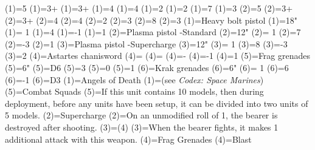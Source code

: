 \renewcommand{\UnitName}{Assault Intercessors }%
\renewcommand{\UnitPower}{10}%
\renewcommand{\UnitIcon}{Troops.svg}%
%
\renewcommand{\StatBlocks}{2}%
\Movement(1)={5}%
\WeaponSkill(1)={3+}%
\BalisticSkill(1)={3+}%
\Strength(1)={4}%
\Toughness(1)={4}%
\Wounds(1)={2}%
\Attacks(1)={2}%
\Leadership(1)={7}%
\Save(1)={3}%
%
\Movement(2)={5}%
\WeaponSkill(2)={3+}%
\BalisticSkill(2)={3+}%
\Strength(2)={4}%
\Toughness(2)={4}%
\Wounds(2)={2}%
\Attacks(2)={3}%
\Leadership(2)={8}%
\Save(2)={3}%
\renewcommand{\UnitText}{9 \UnitName and 1 Sergeant.  Each model is equiped with: \WeaponName(1); \WeaponName(4); \WeaponName(5); \WeaponName(6).}%
%
\renewcommand{\NumWeapon}{6}%
\WeaponName(1)={Heavy bolt pistol}%
\WeaponRange(1)={18"}%
\WeaponType(1)={ 1}%
\WeaponStrength(1)={4}%
\WeaponAP(1)={-1}%
\WeaponDamage(1)={1}%
%
\WeaponName(2)={Plasma pistol -Standard}%
\WeaponRange(2)={12"}%
\WeaponType(2)={ 1}%
\WeaponStrength(2)={7}%
\WeaponAP(2)={-3}%
\WeaponDamage(2)={1}%
%
\WeaponName(3)={Plasma pistol -Supercharge}%
\WeaponRange(3)={12"}%
\WeaponType(3)={ 1}%
\WeaponStrength(3)={8}%
\WeaponAP(3)={-3}%
\WeaponDamage(3)={2}%
%
\WeaponName(4)={Astartes chanisword}%
\WeaponRange(4)={}%
\WeaponType(4)={}%
\WeaponStrength(4)={-}%
\WeaponAP(4)={-1}%
\WeaponDamage(4)={1}%
%
\WeaponName(5)={Frag grenades}%
\WeaponRange(5)={6"}%
\WeaponType(5)={D6}%
\WeaponStrength(5)={3}%
\WeaponAP(5)={0}%
\WeaponDamage(5)={1}%
%
\WeaponName(6)={Krak grenades}%
\WeaponRange(6)={6"}%
\WeaponType(6)={ 1}%
\WeaponStrength(6)={6}%
\WeaponAP(6)={-1}%
\WeaponDamage(6)={D3}%
%
\renewcommand{\NumAbilities}{4}%
\AbilityName(1)={Angels of Death}%
\AbilityDescription(1)={(see \textit{Codex: Space Marines})}%
%
\AbilityName(5)={Combat Squads}%
\AbilityDescription(5)={If this unit contains 10 models, then during deployment, before any units have been setup, it can be divided into two units of 5 models.}%
%
\AbilityName(2)={Supercharge}%
\AbilityDescription(2)={On an unmodified roll of 1, the bearer is destroyed after shooting.}%
%
\AbilityName(3)={\WeaponName(4)}%
\AbilityDescription(3)={When the bearer fights, it makes 1 additional attack with this weapon.}%
%
\AbilityName(4)={Frag Grenades}%
\AbilityDescription(4)={Blast}%
%
\renewcommand{\FactionKeywords}{Imperium, Adeptus Astartes, <Chapter>}%
\renewcommand{\Keywords}{Infantry, Primaris, Assault Intercessor Squad}%
%
\newcommand{\ExtraBackTitle}{\AbilityName(5)}%
\renewcommand{\ExtraBackText}{\AbilityDescription(5)}%
\endinput%